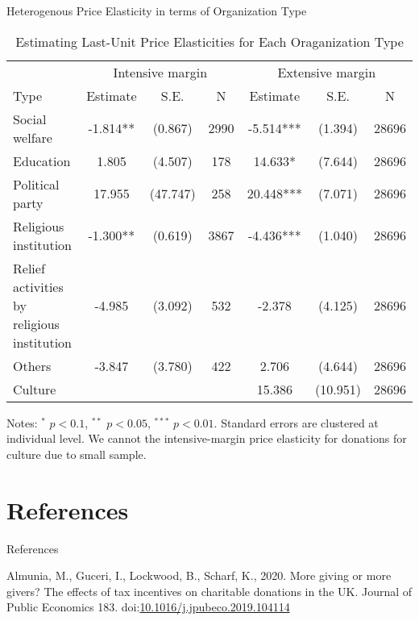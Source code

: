 \documentclass[
  ignorenonframetext,
  aspectratio=169,
]{beamer}
\newlength{\cslhangindent}
\newlength{\cslentryspacingunit} %
\newenvironment{CSLReferences}[2] %
 {%
  \setlength{\parindent}{0pt}
  \ifodd #1
  \let\oldpar\par
  \def\par{\hangindent=\cslhangindent\oldpar}
  \fi
  \setlength{\parskip}{#2\cslentryspacingunit}
 }%
 {}
\begin{document}
\begin{frame}{Heterogenous Price Elasticity in terms of Organization Type}
\protect\hypertarget{heterogenous-price-elasticity-in-terms-of-organization-type}{}
\begin{table}

\caption{\label{tab:TypeHeteroElasticity}Estimating Last-Unit Price Elasticities for Each Oraganization Type}
\centering
\fontsize{8}{10}\selectfont
\begin{threeparttable}
\begin{tabular}[t]{lcccccc}
\toprule
\multicolumn{1}{c}{ } & \multicolumn{3}{c}{Intensive margin} & \multicolumn{3}{c}{Extensive margin} \\
\cmidrule(l{3pt}r{3pt}){2-4} \cmidrule(l{3pt}r{3pt}){5-7}
Type & Estimate & S.E. & N & Estimate & S.E. & N\\
\midrule
Social welfare & -1.814** & (0.867) & 2990 & -5.514*** & (1.394) & 28696\\
Education & 1.805 & (4.507) & 178 & 14.633* & (7.644) & 28696\\
Political party & 17.955 & (47.747) & 258 & 20.448*** & (7.071) & 28696\\
Religious institution & -1.300** & (0.619) & 3867 & -4.436*** & (1.040) & 28696\\
Relief activities by religious institution & -4.985 & (3.092) & 532 & -2.378 & (4.125) & 28696\\
Others & -3.847 & (3.780) & 422 & 2.706 & (4.644) & 28696\\
Culture &  &  &  & 15.386 & (10.951) & 28696\\
\bottomrule
\end{tabular}
\begin{tablenotes}
\item Notes: $^{*}$ $p < 0.1$, $^{**}$ $p < 0.05$, $^{***}$ $p < 0.01$. Standard errors are clustered at individual level. We cannot the intensive-margin price elasticity for donations for culture due to small sample.
\end{tablenotes}
\end{threeparttable}
\end{table}
\end{frame}

\hypertarget{references}{%
\section*{References}\label{references}}

\begin{frame}{References}
\hypertarget{refs}{}
\begin{CSLReferences}{1}{0}
\leavevmode{}%
Almunia, M., Guceri, I., Lockwood, B., Scharf, K., 2020. More giving or more givers? The effects of tax incentives on charitable donations in the UK. Journal of Public Economics 183. doi:\href{https://doi.org/10.1016/j.jpubeco.2019.104114}{10.1016/j.jpubeco.2019.104114}

\end{CSLReferences}
\end{frame}
\end{document}
